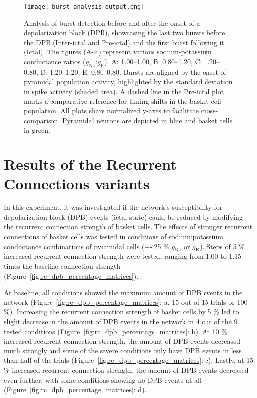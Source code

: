 \begin{figure}[htbp]
    \centering
    \texttt{[image: burst\_analysis\_output.png]}
    \caption[Burst detection near the onset of a depolarization block]{Analysis of burst detection
        before and after the onset of a depolarization block (DPB), showcasing the last two bursts before
        the DPB (Inter-ictal and Pre-ictal) and the first burst following it (Ictal). The figures (A-E)
        represent various sodium-potassium conductance ratios (\(g_{\text{Na}}\):\(g_{\text{K}}\)).
        A\@: 1.00--1.00, B\@: 0.80--1.20, C\@: 1.20--0.80, D\@: 1.20--1.20, E\@: 0.80--0.80.
        Bursts are aligned by the onset of pyramidal population activity, highlighted by the standard
        deviation in spike activity (shaded area). A dashed line in the Pre-ictal plot marks a
        comparative reference for timing shifts in the basket cell population.
        All plots share normalized y-axes to facilitate cross-comparison.
        Pyramidal neurons are depicted in blue and basket cells in green.}\label{fig:burst_detection}
\end{figure}
\pagebreak

\section{Results of the Recurrent Connections variants}
In this experiment, it was investigated if the network's susceptibility for depolarization block (DPB) events (ictal state) could be reduced by modifying the recurrent connection strength of basket cells.
The effects of stronger recurrent connections of basket cells was tested in conditions of sodium:potassium conductance combinations of pyramidal cells (+- 25 \% \(g_{\text{Na}}\) or \(g_{\text{K}}\)).
Steps of 5 \% increased recurrent connection strength were tested, ranging from 1.00 to 1.15 times the baseline connection strength (Figure~\ref{fig:rc_dpb_percentage_matrices}).

At baseline, all conditions showed the maximum amount of DPB events in the network (Figure~\ref{fig:rc_dpb_percentage_matrices}: a, 15 out of 15 trials or 100 \%).
Increasing the recurrent connection strength of basket cells by 5 \% led to slight decrease in the amount of DPB events in the network in 4 out of the 9 tested conditions (Figure~\ref{fig:rc_dpb_percentage_matrices}: b).
At 10 \% increased recurrent connection strength, the amount of DPB events decreased much strongly and some of the severe conditions only have DPB events in less than half of the trials (Figure~\ref{fig:rc_dpb_percentage_matrices}: c).
Lastly, at 15 \% increased recurrent connection strength, the amount of DPB events decreased even further, with some conditions showing no DPB events at all (Figure~\ref{fig:rc_dpb_percentage_matrices}: d).

